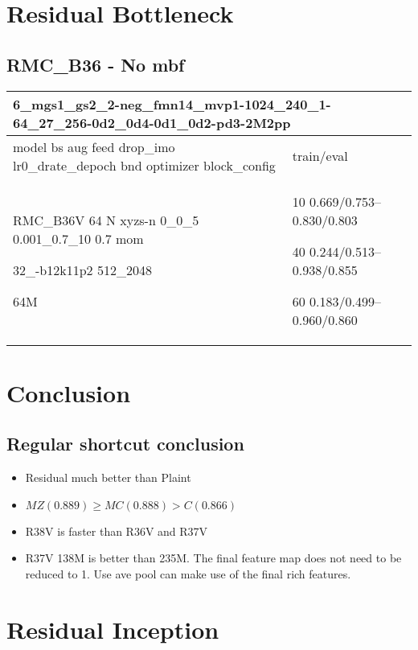 \documentclass[,table,dvipsnames]{article}
\begin{document}
\section{Residual Bottleneck}
\subsection{RMC\_B36 - No mbf}
\noindent\begin{tabular}{|p{10cm}|p{5cm}| }	
	\hline
	\multicolumn{2}{|p{15cm}|}{ 6\_mgs1\_gs2\_2-neg\_fmn14\_mvp1-1024\_240\_1-64\_27\_256-0d2\_0d4-0d1\_0d2-pd3-2M2pp }\\
	\hline
	model bs aug feed drop\_imo lr0\_drate\_depoch bnd optimizer block\_config & train/eval \\
	
	\rowcolor{red!20}
	RMC\_B36V 64 N xyzs-n 0\_0\_5 0.001\_0.7\_10 0.7 mom\par 32\_-b12k11p2 512\_2048\par 64M&10 0.669/0.753--0.830/0.803\par40 0.244/0.513--0.938/0.855\par 60 0.183/0.499--0.960/0.860\\
	
	\hline 
\end{tabular}

\section{Conclusion}
\subsection{Regular shortcut conclusion}
\begin{itemize}
	\item Residual much better than Plaint
	\item $MZ(0.889) \geq MC(0.888) > C(0.866)$
	\item R38V is faster than R36V and R37V
	\item R37V 138M is better than 235M. The final feature map does not need to be reduced to 1. Use ave pool can make use of the final rich features.
\end{itemize}	

\section{Residual Inception}
\end{document}
